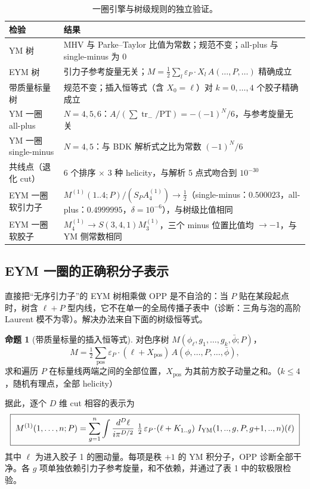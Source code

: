 \documentclass[11pt,a4paper]{ctexart}
\newcommand{\tr}{\operatorname{tr}}
\newcommand{\Mone}{M^{(1)}}
\newcommand{\stat}[2]{\tcbox[on line,colback=#1!10,colframe=#1!70!black,boxrule=0.4pt,arc=1.5pt,
  left=2pt,right=2pt,top=0.6pt,bottom=0.6pt,boxsep=0pt,fontupper=\small\bfseries\color{#1!70!black}]{#2}}
\newcommand{\Exact}{\stat{RoyalBlue}{精确低阶检验}}
\newcommand{\Numer}{\stat{BurntOrange}{数值证据}}
\theoremstyle{definition}
\newtheorem{proposition}[theorem]{命题}
\theoremstyle{remark}
\begin{document}
\begin{table}[h]
\centering\small
\caption{一圈引擎与树级规则的独立验证。}
\begin{tabularx}{\textwidth}{@{}lX@{}}
\toprule
检验 & 结果 \\ \midrule
YM 树 & MHV 与 Parke–Taylor 比值为常数；规范不变；all-plus 与 single-minus 为 $0$ \\
EYM 树 & 引力子参考旋量无关；$M=\tfrac12\sum_l\varepsilon_P\!\cdot\!X_l\,A(\dots,P,\dots)$ 精确成立 \\
带质量标量树 & 规范不变；插入恒等式（含 $X_0=\ell$）对 $k=0,\dots,4$ 个胶子精确成立 \\
YM 一圈 all-plus & $N=4,5,6$：$A/(\sum\tr_-/\mathrm{PT})=-(-1)^N/6$，与参考旋量无关 \\
YM 一圈 single-minus & $N=4,5$：与 BDK 解析式之比为常数 $(-1)^N/6$ \\
共线点（退化 cut） & 6 个排序 $\times$ 3 种 helicity，与解析 5 点式吻合到 $10^{-30}$ \\
EYM 一圈软引力子 & $\Mone(1..4;P)/(S_P A_4^{(1)})\to\tfrac12$（single-minus：$0.500023$，all-plus：$0.4999995$，$\delta=10^{-6}$），与树级比值相同 \\
EYM 一圈软胶子 & $M_4^{(1)}\to S(3,4,1)M_3^{(1)}$，三个 minus 位置比值均 $\to-1$，与 YM 侧常数相同 \\
\bottomrule
\end{tabularx}
\end{table}

\subsection{EYM 一圈的正确积分子表示}
直接把“无序引力子”的 EYM 树相乘做 OPP 是不自洽的：当 $P$ 贴在某段起点时，树含 $\ell+P$ 型内线，它不在单一的全局传播子表中（诊断：三角与泡的高阶 Laurent 模不为零）。解决办法来自下面的树级恒等式。

\begin{proposition}[带质量标量的插入恒等式]\label{prop:ins}
对色序树 $M(\phi_\ell,g_1,\dots,g_k,\bar\phi;P)$，
\[
M=\tfrac12\sum_{\text{pos}}\varepsilon_P\!\cdot\!(\ell+X_{\text{pos}})\,A(\phi,\dots,P,\dots,\bar\phi),
\]
求和遍历 $P$ 在标量线两端之间的全部位置，$X_{\text{pos}}$ 为其前方胶子动量之和。\hfill\Exact（$k\le4$，随机有理点，全部 helicity）
\end{proposition}

据此，逐个 $D$ 维 cut 相容的表示为
\begin{equation}\label{eq:insertion}
\boxed{\;M^{(1)}(1,\dots,n;P)=\sum_{g=1}^{n}\int\frac{d^D\ell}{i\pi^{D/2}}\ \tfrac12\,\varepsilon_P\!\cdot\!(\ell+K_{1..g})\ I_{\rm YM}(1,..,g,P,g{+}1,..,n)(\ell)\;}
\end{equation}
其中 $\ell$ 为进入胶子 1 的圈动量。每项是秩 $+1$ 的 YM 积分子，OPP 诊断全部干净。各 $g$ 项单独依赖引力子参考旋量，和不依赖，并通过了表 1 中的软极限检验。\hfill\Numer
\end{document}

